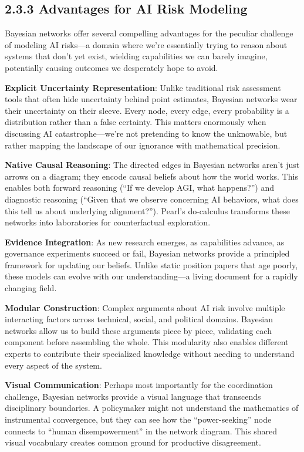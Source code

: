 \documentclass[
  11pt,
  letterpaper,
]{book}
\begin{document}
\newpage{}

\subsection{2.3.3 Advantages for AI Risk
Modeling}\label{sec-modeling-advantages}

Bayesian networks offer several compelling advantages for the peculiar
challenge of modeling AI risks---a domain where we're essentially trying
to reason about systems that don't yet exist, wielding capabilities we
can barely imagine, potentially causing outcomes we desperately hope to
avoid.

\textbf{Explicit Uncertainty Representation}: Unlike traditional risk
assessment tools that often hide uncertainty behind point estimates,
Bayesian networks wear their uncertainty on their sleeve. Every node,
every edge, every probability is a distribution rather than a false
certainty. This matters enormously when discussing AI
catastrophe---we're not pretending to know the unknowable, but rather
mapping the landscape of our ignorance with mathematical precision.

\textbf{Native Causal Reasoning}: The directed edges in Bayesian
networks aren't just arrows on a diagram; they encode causal beliefs
about how the world works. This enables both forward reasoning (``If we
develop AGI, what happens?'') and diagnostic reasoning (``Given that we
observe concerning AI behaviors, what does this tell us about underlying
alignment?''). Pearl's do-calculus \textcite{pearl2009} transforms these
networks into laboratories for counterfactual exploration.

\textbf{Evidence Integration}: As new research emerges, as capabilities
advance, as governance experiments succeed or fail, Bayesian networks
provide a principled framework for updating our beliefs. Unlike static
position papers that age poorly, these models can evolve with our
understanding---a living document for a rapidly changing field.

\textbf{Modular Construction}: Complex arguments about AI risk involve
multiple interacting factors across technical, social, and political
domains. Bayesian networks allow us to build these arguments piece by
piece, validating each component before assembling the whole. This
modularity also enables different experts to contribute their
specialized knowledge without needing to understand every aspect of the
system.

\textbf{Visual Communication}: Perhaps most importantly for the
coordination challenge, Bayesian networks provide a visual language that
transcends disciplinary boundaries. A policymaker might not understand
the mathematics of instrumental convergence, but they can see how the
``power-seeking'' node connects to ``human disempowerment'' in the
network diagram. This shared visual vocabulary creates common ground for
productive disagreement.
\end{document}
